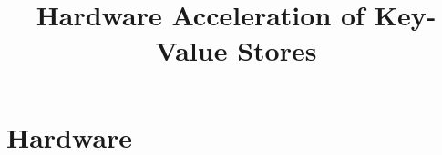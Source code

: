 \documentclass[conference]{IEEEtran}
\title{Hardware Acceleration of Key-Value Stores}
\author{
	\IEEEauthorblockN{Howard Mao}
	\IEEEauthorblockA{\email{zhemao@eecs.berkeley.edu}}
	\and
	\IEEEauthorblockN{Sagar Karandikar}
	\IEEEauthorblockA{\email{skarandikar@berkeley.edu}}
	\and
	\IEEEauthorblockN{Albert Ou}
	\IEEEauthorblockA{\email{aou@eecs.berkeley.edu}}
	\and
	\IEEEauthorblockN{Soumya Basu}
	\IEEEauthorblockA{\email{soumyab@berkeley.edu}}
}
\begin{document}
\maketitle





\section{Hardware}




\nocite{*}
\printbibliography
\end{document}
